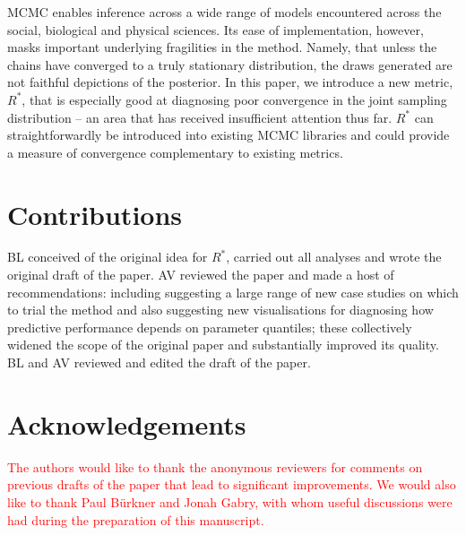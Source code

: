 \documentclass{article}
\begin{document}
MCMC enables inference across a wide range of models encountered across the social, biological and physical sciences. Its ease of implementation, however, masks important underlying fragilities in the method. Namely, that unless the chains have converged to a truly stationary distribution, the draws generated are not faithful depictions of the posterior. In this paper, we introduce a new metric, $R^*$, that is especially good at diagnosing poor convergence in the joint sampling distribution -- an area that has received insufficient attention thus far. $R^*$ can straightforwardly be introduced into existing MCMC libraries and could provide a measure of convergence complementary to existing metrics.


\section{Contributions}
BL conceived of the original idea for $R^*$, carried out all analyses and wrote the original draft of the paper. AV reviewed the paper and made a host of recommendations: including suggesting a large range of new case studies on which to trial the method and also suggesting new visualisations for diagnosing how predictive performance depends on parameter quantiles; these collectively widened the scope of the original paper and substantially improved its quality. BL and AV reviewed and edited the draft of the paper.

\section{Acknowledgements}
\textcolor{red}{The authors would like to thank the anonymous reviewers for comments on previous drafts of the paper that lead to significant improvements. We would also like to thank Paul B{\"u}rkner and Jonah Gabry, with whom useful discussions were had during the preparation of this manuscript.}


 


	
\end{document}
